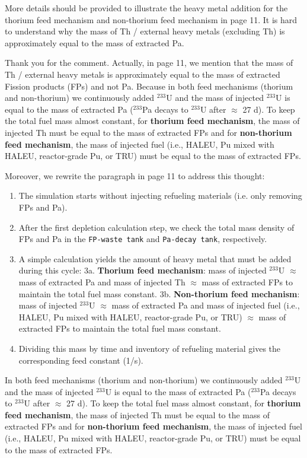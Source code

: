 \documentclass[answers,11pt]{exam}
\begin{document}
\begin{questions}
        \question More details should be provided to illustrate the heavy metal addition for the thorium feed mechanism and non-thorium feed mechanism in page 11. It is hard to understand why the mass of Th / external heavy metals (excluding Th) is approximately equal to the mass of extracted Pa.
        \begin{solution}
               Thank you for the comment. Actually, in page 11, we mention that the mass of Th / external heavy metals is approximately equal to the mass of extracted Fission products (FPs) and not Pa. Because in both feed mechanisms (thorium and non-thorium) we continuously added $^{233}$U and the mass of injected $^{233}$U is equal to the mass of extracted Pa ($^{233}$Pa decays to $^{233}$U after $\approx$ 27 d). To keep the total fuel mass almost constant, for \textbf{thorium feed mechanism}, the mass of injected Th must be equal to the mass of extracted FPs and for \textbf{non-thorium feed mechanism}, the mass of injected fuel (i.e., HALEU, Pu mixed with HALEU, reactor-grade Pu, or TRU) must be equal to the mass of extracted FPs.
              
               Moreover, we rewrite the paragraph in page 11 to address this thought:\\
               \begin{enumerate}
               	\item The simulation starts without injecting refueling materials (i.e. only removing FPs and Pa).
               	\item After the first depletion calculation step, we check the total mass density of FPs and Pa in the \texttt{FP-waste tank} and \texttt{Pa-decay tank}, respectively.
               	\item A simple calculation yields the amount of heavy metal that must be added during this cycle:
               	\subitem 3a. \textbf{Thorium feed mechanism}: mass of injected $^{233}$U $\approx$ mass of extracted Pa and mass of injected Th $\approx$ mass of extracted FPs to maintain the total fuel mass constant.
               	\subitem 3b. \textbf{Non-thorium feed mechanism}: mass of injected $^{233}$U $\approx$ mass of extracted Pa and mass of injected fuel (i.e., HALEU, Pu mixed with HALEU, reactor-grade Pu, or TRU) $\approx$ mass of extracted FPs to maintain the total fuel mass constant.
               	\item Dividing this mass by time and inventory of refueling material gives the corresponding feed constant (1/s).
               \end{enumerate}
               In both feed mechanisms (thorium and non-thorium) we continuously added $^{233}$U and the mass of injected $^{233}$U is equal to the mass of extracted Pa ($^{233}$Pa decays to $^{233}$U after $\approx$ 27 d). To keep the total fuel mass almost constant, for \textbf{thorium feed mechanism}, the mass of injected Th must be equal to the mass of extracted FPs and for \textbf{non-thorium feed mechanism}, the mass of injected fuel (i.e., HALEU, Pu mixed with HALEU, reactor-grade Pu, or TRU) must be equal to the mass of extracted FPs.
               

\end{solution}
\end{questions}
\end{document}
